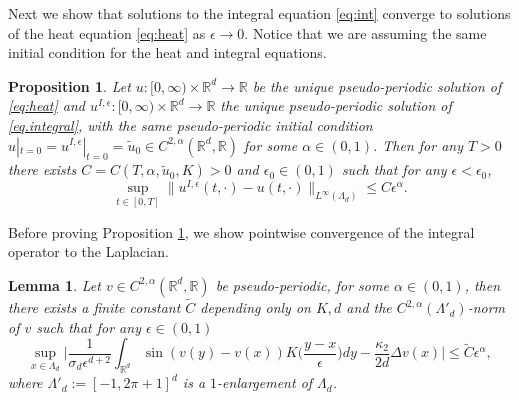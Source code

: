 \documentclass[a4paper,11pt]{amsart}
\newtheorem{lemma}[theorem]{Lemma}
\newtheorem{proposition}[theorem]{Proposition}
\newcommand{\red}[1]{{#1}}
\newcommand{\R}{\mathbb{R}}
\newcommand{\ep}{\epsilon}
\numberwithin{equation}{section}
\numberwithin{theorem}{section}
\theoremstyle{definition}
\begin{document}
Next we show that solutions to the integral equation \eqref{eq:int} converge to solutions of the heat equation \eqref{eq:heat} as $\ep \to 0$. Notice that we are assuming the same initial condition for the heat and integral equations.
\begin{proposition}\label{prop.convergence}
Let $u:[0,\infty)\times\R^d\to\R$ be the \red{unique pseudo-periodic} solution of \eqref{eq:heat} and $u^{I,\ep}:[0,\infty)\times \R^d\to\R$ the \red{unique  pseudo-periodic solution of \eqref{eq.integral}, with the same pseudo-periodic initial condition $u|_{t=0}=u^{I,\ep}|_{t=0}=\tilde u_0\in C^{2,\alpha}(\R^d,\R)$} for some $\alpha\in(0,1)$. Then for any $T>0$ there exists $C=C(T, \alpha, \tilde u_0, K)>0$ and $\ep_0\in(0,1)$ such that for any $\ep<\ep_0$,
\[
\sup_{t\in[0,T]}\|u^{I,\ep}(t,\cdot)-u(t,\cdot)\|_{L^\infty(\Lambda_d)}\leq C\ep^\alpha.
\]
\end{proposition}

Before proving Proposition \ref{prop.convergence}, we show pointwise convergence of the integral operator to the Laplacian.
\begin{lemma}\label{lem:integraltoheat}
\red{Let $v\in C^{2,\alpha}(\R^d, \R)$ be pseudo-periodic, for some  $\alpha\in(0,1)$, then there exists a finite constant $\tilde C$ depending only on $K, d$ and the $C^{2,\alpha}(\Lambda'_d)$-norm of $v$ such that for any $\ep\in(0,1)$
\[
\sup_{x\in\Lambda_d}\Big|\frac{1}{\sigma_d\ep^{d+2}}\int_{\R^d}\sin\left(v(y)-v(x)\right)K\Big(\frac{y-x}{\ep}\Big)dy-\frac{\kappa_2}{2d}\Delta v(x)\Big|\le \tilde {C}\ep^\alpha,
\]
where $\Lambda'_d:=[-1,2\pi+1]^d$ is a $1$-enlargement of $\Lambda_d$.}
\end{lemma}
\end{document}
